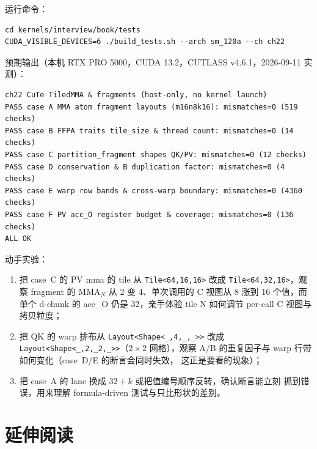 运行命令：

\begin{lstlisting}[style=console]
cd kernels/interview/book/tests
CUDA_VISIBLE_DEVICES=6 ./build_tests.sh --arch sm_120a --ch ch22
\end{lstlisting}

预期输出（本机 RTX PRO 5000，CUDA 13.2，CUTLASS v4.6.1，2026-09-11 实测）：

\begin{lstlisting}[style=console]
ch22 CuTe TiledMMA & fragments (host-only, no kernel launch)
PASS case A MMA atom fragment layouts (m16n8k16): mismatches=0 (519 checks)
PASS case B FFPA traits tile_size & thread count: mismatches=0 (14 checks)
PASS case C partition_fragment shapes QK/PV: mismatches=0 (12 checks)
PASS case D conservation & B duplication factor: mismatches=0 (4 checks)
PASS case E warp row bands & cross-warp boundary: mismatches=0 (4360 checks)
PASS case F PV acc_O register budget & coverage: mismatches=0 (136 checks)
ALL OK
\end{lstlisting}

动手实验：

\begin{enumerate}
  \item 把 case~C 的 PV mma 的 tile 从 \texttt{Tile\allowbreak{}<64,\allowbreak{}16,\allowbreak{}16>} 改成
        \texttt{Tile\allowbreak{}<64,\allowbreak{}32,\allowbreak{}16>}，观察 fragment 的 $\mathrm{MMA}_N$ 从 2 变
        4、单次调用的 C 视图从 8 涨到 16 个值，而单个 d-chunk 的 acc\_O
        仍是 32，亲手体验 tile N 如何调节 per-call C 视图与拷贝粒度；
  \item 把 QK 的 warp 排布从 \texttt{Layout\allowbreak{}<Shape\allowbreak{}<\_\allowbreak{},\allowbreak{}4,\allowbreak{}\_\allowbreak{},\allowbreak{}\_\allowbreak{}>>} 改成
        \texttt{Layout\allowbreak{}<Shape\allowbreak{}<\_\allowbreak{},\allowbreak{}2,\allowbreak{}\_\allowbreak{}2,\allowbreak{}\_\allowbreak{}>>}（$2\times2$ 网格），观察
        A/B 的重复因子与 warp 行带如何变化（case~D/E 的断言会同时失效，
        这正是要看的现象）；
  \item 把 case~A 的 lane 换成 $32+k$ 或把值编号顺序反转，确认断言能立刻
        抓到错误，用来理解 formula-driven 测试与只比形状的差别。
\end{enumerate}

\section*{延伸阅读}

